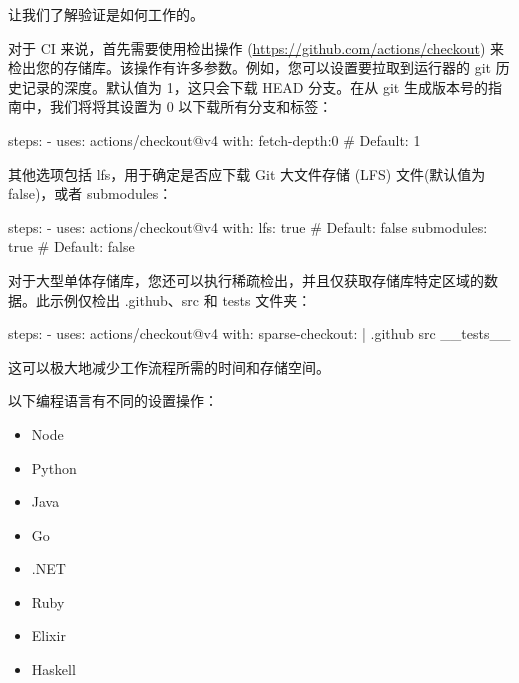 
让我们了解验证是如何工作的。


对于 CI 来说，首先需要使用检出操作 (\url{https://github.com/actions/checkout}) 来检出您的存储库。该操作有许多参数。例如，您可以设置要拉取到运行器的 git 历史记录的深度。默认值为 1，这只会下载 HEAD 分支。在从 git 生成版本号的指南中，我们将将其设置为 0 以下载所有分支和标签：

\begin{shell}
steps:
  - uses: actions/checkout@v4
    with:
      fetch-depth:0 # Default: 1
\end{shell}

其他选项包括 lfs，用于确定是否应下载 Git 大文件存储 (LFS) 文件(默认值为 false)，或者 submodules：

\begin{shell}
steps:
  - uses: actions/checkout@v4
    with:
      lfs: true # Default: false
      submodules: true # Default: false
\end{shell}
  
对于大型单体存储库，您还可以执行稀疏检出，并且仅获取存储库特定区域的数据。此示例仅检出 .github、src 和 tests 文件夹：

\begin{shell}
steps:
  - uses: actions/checkout@v4
    with:
      sparse-checkout: |
        .github
        src
        __tests__
\end{shell}

这可以极大地减少工作流程所需的时间和存储空间。


以下编程语言有不同的设置操作：

\begin{itemize}
\item 
Node

\item
Python

\item
Java

\item
Go

\item
.NET

\item
Ruby

\item
Elixir

\item
Haskell
\end{itemize}

